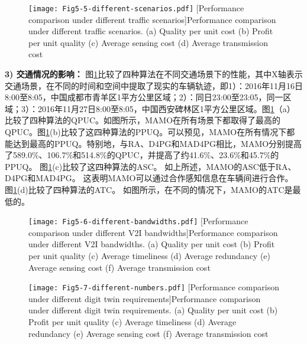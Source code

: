 \begin{figure}[h]
 \centering
 \texttt{[image: Fig5-5-different-scenarios.pdf]}
 [Performance comparison under different traffic scenarios]{Performance comparison under different traffic scenarios. (a) Quality per unit cost (b) Profit per unit quality (c) Average sensing cost (d) Average transmission cost}
 \label{fig 4-5}
\end{figure}

\textbf{3) 交通情况的影响：}
图\ref{fig 4-5}比较了四种算法在不同交通场景下的性能，其中X轴表示交通场景，在不同的时间和空间中提取了现实的车辆轨迹，即1）：2016年11月16日8:00至8:05，中国成都市青羊区1平方公里区域；2）：同日23:00至23:05，同一区域；3）：2016年11月27日8:00至8:05，中国西安碑林区1平方公里区域。图\ref{fig 4-5}（a）比较了四种算法的QPUC。如图所示，MAMO在所有场景下都取得了最高的QPUC。图\ref{fig 4-5}(b)比较了这四种算法的PPUQ。可以预见，MAMO在所有情况下都能达到最高的PPUQ。特别地，与RA、D4PG和MAD4PG相比，MAMO分别提高了589.0\%、106.7\%和514.8\%的QPUC，并提高了约41.6\%、23.6\%和45.7\%的PPUQ。
图\ref{fig 4-5}(c)比较了这四种算法的ASC。
如上所述，MAMO的ASC低于RA、D4PG和MAD4PG。
这表明MAMO可以通过合作感知信息在车辆间进行合作。
图\ref{fig 4-5}(d)比较了四种算法的ATC。
如图所示，在不同的情况下，MAMO的ATC是最低的。

\begin{figure}[h]
 \centering
 \texttt{[image: Fig5-6-different-bandwidths.pdf]}
 [Performance comparison under different V2I bandwidths]{Performance comparison under different V2I bandwidths. (a) Quality per unit cost (b) Profit per unit quality (c) Average timeliness (d) Average redundancy (e) Average sensing cost (f) Average transmission cost}
 \label{fig 4-6}
\end{figure}

\begin{figure}[h]
 \centering
 \texttt{[image: Fig5-7-different-numbers.pdf]}
 [Performance comparison under different digit twin requirements]{Performance comparison under different digit twin requirements. (a) Quality per unit cost (b) Profit per unit quality (c) Average timeliness (d) Average redundancy (e) Average sensing cost (f) Average transmission cost}
 \label{fig 4-7}
\end{figure}

